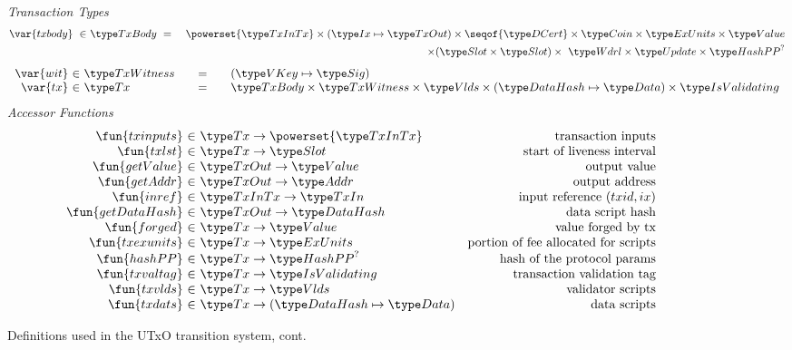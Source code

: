 \begin{figure*}[htb]
  \emph{Transaction Types}
  \begin{align*}
    \var{txbody} ~\in~
    & \TxBody ~=~
    & \powerset{\TxInTx} \times (\Ix \mapsto \TxOut) \times \seqof{\DCert}
      \times \Coin \times \ExUnits \times \Value \\
    & ~& \times (\Slot\times\Slot) \times~ \Wdrl \times \Update \times \HashPP^?
  \end{align*}
  \begin{equation*}
    \begin{array}{r@{~\in~}l@{\qquad=\qquad}l}
      \var{wit} & \TxWitness & (\VKey \mapsto \Sig)
      \\
      \var{tx}
      & \Tx
      & \TxBody \times \TxWitness \times \Vlds \times (\HashDat \mapsto \Data)
      \times \IsValidating
    \end{array}
  \end{equation*}
  \emph{Accessor Functions}
  \begin{equation*}
    \begin{array}{r@{~\in~}lr}
      \fun{txinputs} & \Tx \to \powerset{\TxInTx} & \text{transaction inputs} \\
      \fun{txlst} & \Tx \to \Slot & \text{start of liveness interval} \\
      \fun{getValue} & \TxOut \to \Value & \text{output value} \\
      \fun{getAddr} & \TxOut \to \Addr & \text{output address} \\
      \fun{inref} & \TxInTx \to \TxIn & \text{input reference $(txid,ix)$} \\
      \fun{getDataHash} & \TxOut \to \HashDat & \text{data script hash} \\
      \fun{forged} & \Tx \to \Value & \text{value forged by tx}\\
      \fun{txexunits} & \Tx \to \ExUnits & \text{portion of fee allocated for scripts}\\
      \fun{hashPP} & \Tx \to \HashPP^? & \text{hash of the protocol params}\\
      \fun{txvaltag} & \Tx \to \IsValidating & \text{transaction validation tag}\\
      \fun{txvlds} & \Tx \to \Vlds & \text{validator scripts}\\
      \fun{txdats} & \Tx \to (\HashDat \mapsto \Data) & \text{data scripts}\\
    \end{array}
  \end{equation*}
  \caption{Definitions used in the UTxO transition system, cont.}
  \label{fig:defs:utxo-shelley-2}
\end{figure*}


